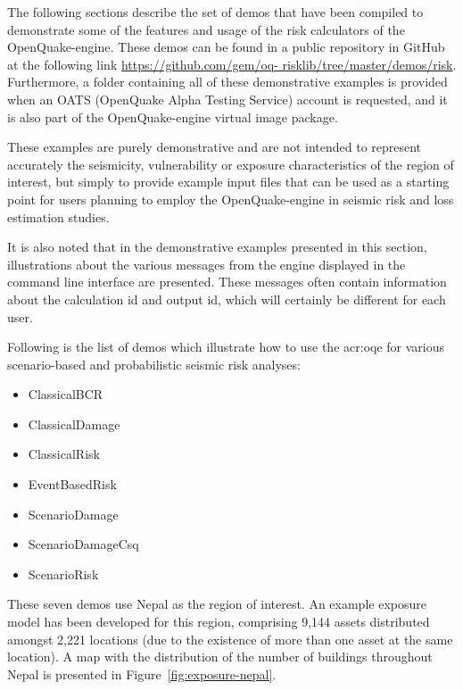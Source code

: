 The following sections describe the set of demos that have been compiled to
demonstrate some of the features and usage of the risk calculators of the
OpenQuake-engine. These demos can be found in a public repository in GitHub at
the following link \href{https://github.com/gem/oq-
risklib/tree/master/demos/risk}{https://github.com/gem/oq-
risklib/tree/master/demos/risk}. Furthermore, a folder containing all of these
demonstrative examples is provided when an OATS (OpenQuake Alpha Testing
Service) account is requested, and it is also part of the OpenQuake-engine
virtual image package.

These examples are purely demonstrative and are not intended to represent
accurately the seismicity, vulnerability or exposure characteristics of the
region of interest, but simply to provide example input files that can be used
as a starting point for users planning to employ the OpenQuake-engine in seismic
risk and loss estimation studies.

It is also noted that in the demonstrative examples presented in this section,
illustrations about the various messages from the engine displayed in the
command line interface are presented. These messages often contain information
about the calculation id and output id, which will certainly be different for
each user.

Following is the list of demos which illustrate how to use the \gls{acr:oqe} for
various scenario-based and probabilistic seismic risk analyses:

\begin{itemize}

    \item ClassicalBCR
	\item ClassicalDamage
    \item ClassicalRisk
    \item EventBasedRisk
    \item ScenarioDamage
    \item ScenarioDamageCsq
    \item ScenarioRisk

\end{itemize}

These seven demos use Nepal as the region of interest. An example \gls{exposure
model} has been developed for this region, comprising 9,144 assets distributed
amongst 2,221 locations (due to the existence of more than one \gls{asset} at
the same location). A map with the distribution of the number of buildings
throughout Nepal is presented in Figure~\ref{fig:exposure-nepal}.

